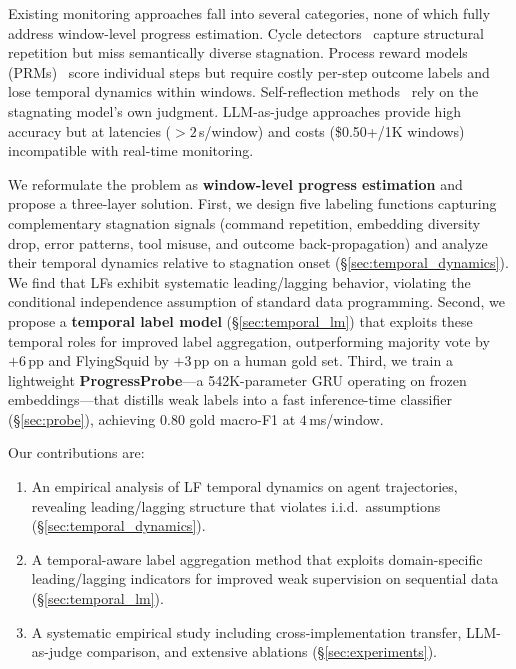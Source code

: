 \documentclass[11pt]{article}
\begin{document}
Existing monitoring approaches fall into several categories, none of which fully address window-level progress estimation.
Cycle detectors~\citep{chen2024cdcs} capture structural repetition but miss semantically diverse stagnation.
Process reward models (PRMs)~\citep{lightman2023lets,wang2024mathshepherd} score individual steps but require costly per-step outcome labels and lose temporal dynamics within windows.
Self-reflection methods~\citep{shinn2023reflexion,yao2023tree} rely on the stagnating model's own judgment.
LLM-as-judge approaches provide high accuracy but at latencies ($>2$\,s/window) and costs (\$0.50+/1K windows) incompatible with real-time monitoring.

We reformulate the problem as \textbf{window-level progress estimation} and propose a three-layer solution.
First, we design five labeling functions capturing complementary stagnation signals (command repetition, embedding diversity drop, error patterns, tool misuse, and outcome back-propagation) and analyze their temporal dynamics relative to stagnation onset (\S\ref{sec:temporal_dynamics}).
We find that LFs exhibit systematic leading/lagging behavior, violating the conditional independence assumption of standard data programming.
Second, we propose a \textbf{temporal label model} (\S\ref{sec:temporal_lm}) that exploits these temporal roles for improved label aggregation, outperforming majority vote by $+6$\,pp and FlyingSquid by $+3$\,pp on a human gold set.
Third, we train a lightweight \textbf{ProgressProbe}---a 542K-parameter GRU operating on frozen embeddings---that distills weak labels into a fast inference-time classifier (\S\ref{sec:probe}), achieving $0.80$ gold macro-F1 at $4$\,ms/window.

Our contributions are:
\begin{enumerate}
\item An empirical analysis of LF temporal dynamics on agent trajectories, revealing leading/lagging structure that violates i.i.d.\ assumptions (\S\ref{sec:temporal_dynamics}).
\item A temporal-aware label aggregation method that exploits domain-specific leading/lagging indicators for improved weak supervision on sequential data (\S\ref{sec:temporal_lm}).
\item A systematic empirical study including cross-implementation transfer, LLM-as-judge comparison, and extensive ablations (\S\ref{sec:experiments}).
\end{enumerate}

\end{document}
